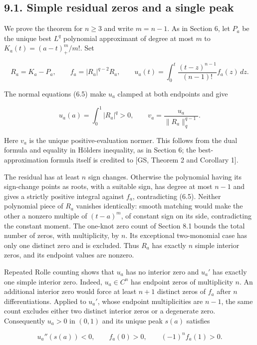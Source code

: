 \documentclass[11pt]{article}
\begin{document}
\subsection{9.1. Simple residual zeros and a single
peak}\label{simple-residual-zeros-and-a-single-peak}

We prove the theorem for \(n\ge3\) and write \(m=n-1\). As in Section 6,
let \(P_a\) be the unique best \(L^q\) polynomial approximant of degree
at most \(m\) to \(K_a(t)=(a-t)_+^m/m!\). Set

\[
R_a=K_a-P_a,\qquad f_a=|R_a|^{q-2}R_a,\qquad
u_a(t)=\int_0^t\frac{(t-z)^{n-1}}{(n-1)!}f_a(z)\,dz.
\tag{9.2}
\]

The normal equations (6.5) make \(u_a\) clamped at both endpoints and
give

\[
u_a(a)=\int_0^1|R_a|^q>0,\qquad
v_a=\frac{u_a}{\|R_a\|_q^{q-1}}.
\tag{9.3}
\]

Here \(v_a\) is the unique positive-evaluation normer. This follows from
the dual formula and equality in Hölder\textquotesingle s inequality, as
in Section 6; the best-approximation formula itself is credited to
{[}GS, Theorem 2 and Corollary 1{]}.

The residual has at least \(n\) sign changes. Otherwise the polynomial
having its sign-change points as roots, with a suitable sign, has degree
at most \(n-1\) and gives a strictly positive integral against \(f_a\),
contradicting (6.5). Neither polynomial piece of \(R_a\) vanishes
identically: smooth matching would make the other a nonzero multiple of
\((t-a)^m\), of constant sign on its side, contradicting the constant
moment. The one-knot zero count of Section 8.1 bounds the total number
of zeros, with multiplicity, by \(n\). Its exceptional two-monomial case
has only one distinct zero and is excluded. Thus \(R_a\) has exactly
\(n\) simple interior zeros, and its endpoint values are nonzero.

Repeated Rolle counting shows that \(u_a\) has no interior zero and
\(u_a'\) has exactly one simple interior zero. Indeed, \(u_a\in C^n\)
has endpoint zeros of multiplicity \(n\). An additional interior zero
would force at least \(n+1\) distinct zeros of \(f_a\) after \(n\)
differentiations. Applied to \(u_a'\), whose endpoint multiplicities are
\(n-1\), the same count excludes either two distinct interior zeros or a
degenerate zero. Consequently \(u_a>0\) in \((0,1)\) and its unique peak
\(s(a)\) satisfies

\[
u_a''(s(a))<0,\qquad
f_a(0)>0,\qquad (-1)^nf_a(1)>0.
\tag{9.4}
\]
\end{document}
